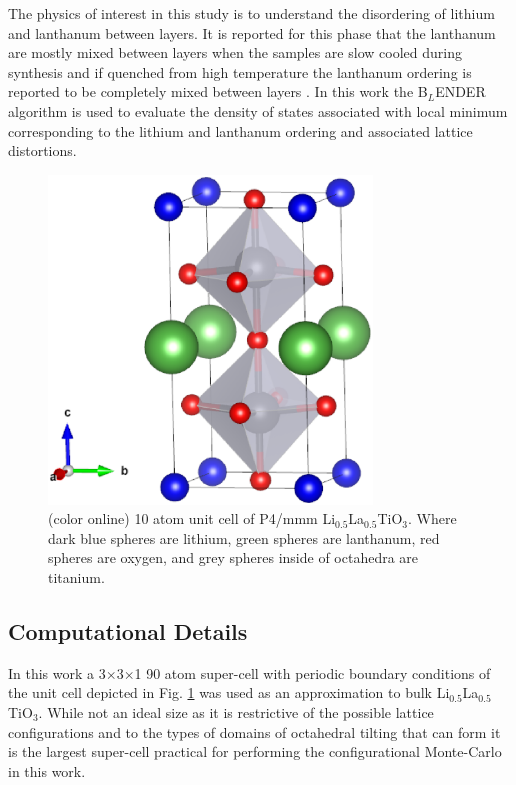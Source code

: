 \documentclass[aps,pre,reprint,superscriptaddress,showkeys]{revtex4-2}
\begin{document}
The physics of interest in this study is to understand the disordering of lithium and lanthanum between layers.  It is reported for this phase that the lanthanum are mostly mixed between layers when the samples are slow cooled during synthesis and if quenched from high temperature the lanthanum ordering is reported to be completely mixed between layers \cite{P4mmmstrucuture}. In this work the B$_L$ENDER algorithm is used to evaluate the density of states associated with local minimum corresponding to  the lithium and lanthanum ordering and associated lattice distortions.   
\begin{figure}[h!]
\includegraphics[width=8.6cm]{fig6.eps}
\caption{(color online) 10 atom unit cell of P4/mmm Li$_{0.5}$La$_{0.5}$TiO$_{3}$. Where dark blue spheres are lithium, green spheres are lanthanum, red spheres are oxygen, and grey spheres inside of octahedra are titanium.\label{LLTO_unit_cell}}
\end{figure}
\subsection{Computational Details}
In this work a 3$\times$3$\times$1 90 atom super-cell with periodic boundary conditions of the unit cell depicted in Fig. \ref{LLTO_unit_cell} was used as an approximation to bulk Li$_{0.5}$La$_{0.5}$TiO$_{3}$. While not an ideal size as it is  restrictive of the possible lattice configurations and to the types of domains of octahedral tilting that can form it is the largest super-cell practical for performing the configurational Monte-Carlo in this work. 
\end{document}
